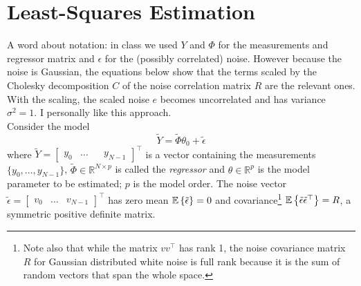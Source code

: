 \chapter{Least-Squares Estimation}
\label{chap:LS-estimation}

A word about notation: in class we used $Y$ and $\Phi$ for the measurements and regressor matrix and $\epsilon$ for the (possibly correlated) noise. However because the noise is Gaussian, the equations below show that the terms scaled by the Cholesky decomposition $C$ of the noise correlation matrix $R$ are the relevant ones. With the scaling, the scaled noise $e$ becomes uncorrelated and has variance $\sigma^2=1$. I personally like this approach.\\

Consider the model
\begin{equation}
  \label{eq:LTI-with-noise}
  \tilde{Y} = \tilde{\Phi}\theta_0 + \tilde{\epsilon}
\end{equation}
where $\tilde{Y} = \begin{bmatrix}
  y_0 & \ldots && y_{N-1}
\end{bmatrix}^\top$ is a vector containing the measurements $\{y_0,\ldots, y_{N-1}\}$, $\tilde{\Phi}\in \mathbb{R}^{N\times p}$ is called the \emph{regressor} and $\theta\in\mathbb{R}^p$ is the model parameter to be estimated; $p$ is the model order. The noise vector $\tilde{\epsilon} =
\begin{bmatrix}
  v_0 & \ldots & v_{N-1}
\end{bmatrix}^\top$ has zero mean $\mathbb{E}\left\{\tilde{\epsilon}\right\}=0$ and covariance\footnote{Note also that while the matrix $vv^\top$ has rank 1, the noise covariance matrix $R$ for Gaussian distributed white noise is full rank because it is the sum of random vectors that span the whole space.} $\mathbb{E}\left\{\tilde{\epsilon}\tilde{\epsilon}^\top\right\}=R$, a symmetric positive definite matrix.

